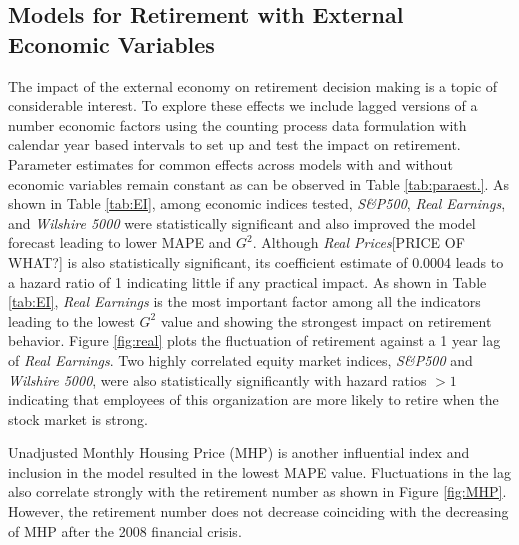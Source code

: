 \documentclass[12pt,letterpaper]{article}
\begin{document}
\subsection{Models for Retirement with External Economic Variables}
   The impact of the external economy on retirement decision making is a topic of considerable interest.  To explore these effects we include lagged versions of a number economic factors using the counting process data formulation with calendar year based intervals to set up and test the impact on retirement. Parameter estimates for common effects across models with and without economic variables remain constant as can be observed in Table \ref{tab:paraest.}.  As shown in Table \ref{tab:EI}, among economic indices tested, {\it S\&P500}, {\it Real Earnings}, and {\it Wilshire 5000} were statistically significant and also improved the model forecast leading to lower MAPE and $G^2$.  Although {\it Real Prices}[PRICE OF WHAT?] is also statistically significant, its coefficient estimate of 0.0004 leads to a hazard ratio of 1 indicating little if any practical impact. As shown in Table \ref{tab:EI}, {\it Real Earnings} is the most important factor among all the indicators leading to the lowest $G^2$ value and showing the strongest impact on retirement behavior.  Figure \ref{fig:real} plots the fluctuation of retirement against a 1 year lag of {\it Real Earnings}. Two highly correlated equity market indices, {\it S\&P500} and {\it Wilshire 5000}, were also statistically significantly with hazard ratios $>1$ indicating that employees of this organization are more likely to retire when the stock market is strong.

   Unadjusted Monthly Housing Price (MHP) is another influential index and inclusion in the model resulted in the lowest MAPE value. Fluctuations in the lag also correlate strongly with the retirement number as shown in Figure \ref{fig:MHP}. However, the retirement number does not decrease coinciding with the decreasing of MHP after the 2008 financial crisis.
   
\end{document}
